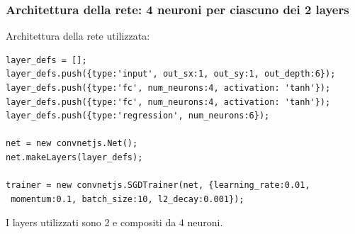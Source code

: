 \subsubsection{Architettura  della rete: 4 neuroni per ciascuno dei 2 layers}
\label{Configurazione della rete: 4 neuroni per ciascuno dei 2 layers}

Architettura  della rete utilizzata:\\
\begin{verbatim}layer_defs = [];
layer_defs.push({type:'input', out_sx:1, out_sy:1, out_depth:6});
layer_defs.push({type:'fc', num_neurons:4, activation: 'tanh'});
layer_defs.push({type:'fc', num_neurons:4, activation: 'tanh'});
layer_defs.push({type:'regression', num_neurons:6});

net = new convnetjs.Net();
net.makeLayers(layer_defs);

trainer = new convnetjs.SGDTrainer(net, {learning_rate:0.01,
 momentum:0.1, batch_size:10, l2_decay:0.001});
\end{verbatim}
\noindent
I layers utilizzati sono 2 e compositi da 4 neuroni.


